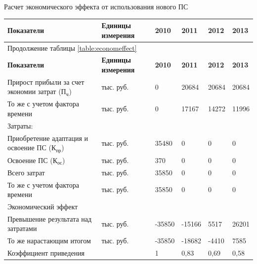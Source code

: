 \documentclass[14pt,a4paper]{reportmod}
\begin{document}
\begin{table}[ht]
  \caption{Расчет экономического эффекта от использования нового ПС}
  \label{table:economeffect}
\end{table}
\vspace{-0.5cm}
\begin{small}
    \begin{longtable}{|p{5cm}|p{2cm}|p{1.7cm}|p{1.7cm}|p{1.7cm}|p{1.7cm}|}
      \hline
      \multicolumn{1}{|p{5cm}|}{\bfseries{Показатели}} &
      \multicolumn{1}{p{2cm}|}{\bfseries{Единицы измерения}} &
      \multicolumn{1}{p{1.7cm}|}{\bfseries{2010}} &
      \multicolumn{1}{p{1.7cm}|}{\bfseries{2011}} &
      \multicolumn{1}{p{1.7cm}|}{\bfseries{2012}} &
      \multicolumn{1}{p{1.7cm}|}{\bfseries{2013}} \\
      \hline
      \endfirsthead
      \multicolumn{6}{l}{{Продолжение таблицы \ref{table:economeffect}}} \\ \hline
      \multicolumn{1}{|p{5cm}|}{\bfseries{Показатели}} &
      \multicolumn{1}{p{2cm}|}{\bfseries{Единицы измерения}} &
      \multicolumn{1}{p{1.7cm}|}{\bfseries{2010}} &
      \multicolumn{1}{p{1.7cm}|}{\bfseries{2011}} &
      \multicolumn{1}{p{1.7cm}|}{\bfseries{2012}} &
      \multicolumn{1}{p{1.7cm}|}{\bfseries{2013}} \\
      \hline
      \endhead
      Прирост прибыли за счет экономии затрат ($П_{ч}$) & тыс. руб. & 0 & 20684 & 20684 & 20684 \\
      \hline
      То же с учетом фактора времени & тыс. руб. & 0 & 17167 & 14272 & 11996 \\
      \hline
      Затраты: & & & & & \\
      \hline
      Приобретение адаптация и освоение ПС ($К_{пр}$) & тыс. руб. & 35480 & 0 & 0 & 0 \\
      \hline
      Освоение ПС ($К_{ос}$) & тыс. руб. & 370 & 0 & 0 & 0 \\
      \hline
      Всего затрат & тыс. руб. & 35850 & 0 & 0 & 0 \\
      \hline
      То же с учетом фактора времени & тыс. руб. & 35850 & 0 & 0 & 0 \\
      \hline
      Экономический эффект & & & & & \\
      \hline
      Превышение результата над затратами & тыс. руб. & -35850 & -15166 & 5517 & 26201 \\
      \hline
      То же нарастающим итогом & тыс. руб. & -35850 & -18682 & -4410 & 7585 \\
      \hline
      Коэффициент приведения & & 1 & 0,83 & 0,69 & 0,58 \\
      \hline
    \end{longtable}
\end{small}
\end{document}
